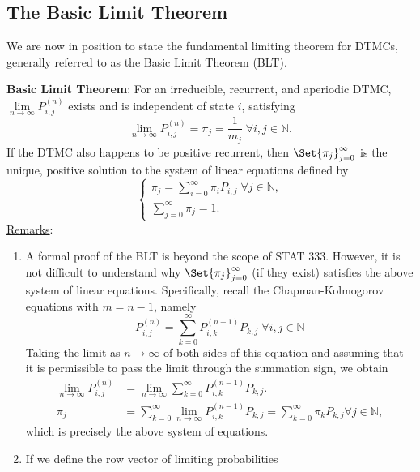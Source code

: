 \subsection*{The Basic Limit Theorem}
We are now in position to state the fundamental limiting theorem for DTMCs, generally
referred to as the Basic Limit Theorem (BLT).
\begin{Result}
    \textbf{Basic Limit Theorem}: For an irreducible, recurrent, and aperiodic DTMC, $ \lim\limits_{{n} \to {\infty}} P_{i,j}^{(n)} $
    exists and is independent of state $ i $, satisfying
    \[ \lim\limits_{{n} \to {\infty}} P_{i,j}^{(n)}=\pi_j=\frac{1}{m_j}\;\forall i,j\in\mathbb{N}. \]
    If the DTMC also happens to be positive recurrent, then $ \Set{\pi_j}_{j=0}^\infty $ is the unique, positive
    solution to the system of linear equations defined by
    \[ \begin{cases}
            \pi_j=\sum_{i=0}^{\infty} \pi_i P_{i,j}\;\forall j\in\mathbb{N}, \\
            \sum_{j=0}^{\infty} \pi_j=1.
        \end{cases} \]
    \tcblower{}
    \underline{Remarks}:
    \begin{enumerate}[(1)]
        \item A formal proof of the BLT is beyond the scope of STAT 333. However, it is not difficult
              to understand why $ \Set{\pi_j}_{j=0}^\infty $ (if they exist) satisfies the above system of linear equations.
              Specifically, recall the Chapman-Kolmogorov equations with $m = n - 1$, namely
              \[ P_{i, j}^{(n)}=\sum_{k=0}^{\infty} P_{i, k}^{(n-1)} P_{k, j}\; \forall i, j \in \mathbb{N} \]
              Taking the limit as $ n\to\infty $ of both sides of this equation and assuming that it is
              permissible to pass the limit through the summation sign, we obtain
              \begin{align*}
                  \lim _{n \rightarrow \infty} P_{i, j}^{(n)} & =\lim _{n \rightarrow \infty} \sum_{k=0}^{\infty} P_{i, k}^{(n-1)} P_{k, j}.                                                               \\
                  \pi_{j}                                     & =\sum_{k=0}^{\infty} \lim _{n \rightarrow \infty} P_{i, k}^{(n-1)} P_{k, j}=\sum_{k=0}^{\infty} \pi_{k} P_{k, j} \forall j \in \mathbb{N},
              \end{align*}
              which is precisely the above system of equations.
        \item If we define the row vector of limiting probabilities

\end{enumerate}
\end{Result}
